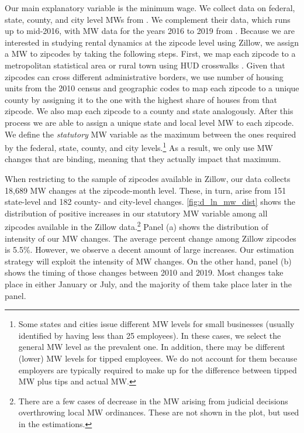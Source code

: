 Our main explanatory variable is the minimum wage. We collect data on federal, state, 
county, and city level MWs from \textcite{VaghulZipperer2016}. We complement their data,
which runs up to mid-2016, with MW data for the years 2016 to 2019 from 
\textcite{BerkeleyLaborCenter}. Because  we are interested in studying rental dynamics at 
the zipcode level using Zillow, we assign a MW to zipcodes by taking the following steps.
First, we map each zipcode to a metropolitan statistical area or rural town using HUD 
crosswalks \parencite{hudCrosswalks}. Given that zipcodes can cross different administrative
borders, we use number of housing units from the 2010 census and geographic codes to map 
each zipcode to a unique county by assigning it to the one with the highest share of houses 
from that zipcode. We also map each zipcode to a county and state analogously. After this 
process we are able to assign a unique state and local level MW to each zipcode. We define 
the \textit{statutory} MW variable as the maximum between the ones required by the federal, 
state, county, and city levels.\footnote{Some states and cities issue different MW levels 
	for small businesses (usually identified by having less than 25 employees). In these 
	cases, we select the general MW level as the prevalent one. In addition, there may be 
	different (lower) MW levels for tipped employees. We do not account for them because 
	employers are typically required to make up for the difference between tipped MW plus 
	tips and actual MW.}
As a result, we only use MW changes that are binding, meaning that they actually impact 
that maximum. 

When restricting to the sample of zipcodes available in Zillow, our data collects 18,689 
MW changes at the zipcode-month level. These, in turn, arise from 151 state-level and 182 
county- and city-level changes. \autoref{fig:d_ln_mw_dist} shows the distribution of 
positive increases in our statutory MW variable among all zipcodes available in the 
Zillow data.\footnote{There are a few cases of decrease in the MW arising from judicial 
	decisions overthrowing local MW ordinances. These are not shown in the plot, but
	used in the estimations.}
Panel (a) shows the distribution of intensity of our MW changes. The average percent 
change among Zillow zipcodes is 5.5\%. %
However, we observe a decent amount of large increases. Our estimation strategy will
exploit the intensity of MW changes. On the other hand, panel (b) shows the timing of 
those changes between 2010 and 2019. Most changes take place in either January or July, 
and the majority of them take place later in the panel.

